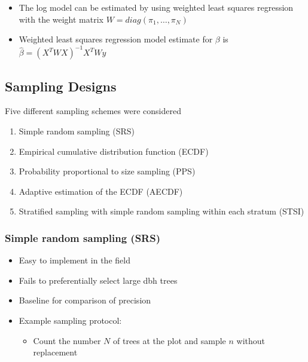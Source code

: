 \documentclass{beamer}
\begin{document}
%
\begin{frame}
  \begin{itemize}
    \item The log model can be estimated by using weighted least squares regression with the weight matrix $W = diag(\pi_1, \ldots, \pi_N)$ \vspace{3mm}
    \item Weighted least squares regression model estimate for $\beta$ is $\hat{\beta} = (X^T W X)^{ - 1} X^T W y$ \vspace{3mm}
  \end{itemize}
\end{frame}
%
\begin{frame}
  \section{Sampling Designs}
%
  Five different sampling schemes were considered %
  \begin{enumerate}
    \item Simple random sampling (SRS)
    \item Empirical cumulative distribution function (ECDF)
    \item Probability proportional to size sampling (PPS)
    \item Adaptive estimation of the ECDF (AECDF)
    \item Stratified sampling with simple random sampling within each stratum (STSI)
  \end{enumerate}
\end{frame}
%
\begin{frame}
  \frametitle{Simple random sampling (SRS)}
  \begin{itemize}
    \item Easy to implement in the field  \vspace{3mm}
    \item Fails to preferentially select large dbh trees \vspace{3mm}
    \item Baseline for comparison of precision \vspace{3mm}
    \item Example sampling protocol:\vspace{3mm}
    \begin{itemize}
      \item Count the number $N$ of trees at the plot and sample $n$ without replacement
    \end{itemize}    
  \end{itemize}
\end{frame}
\end{document}
